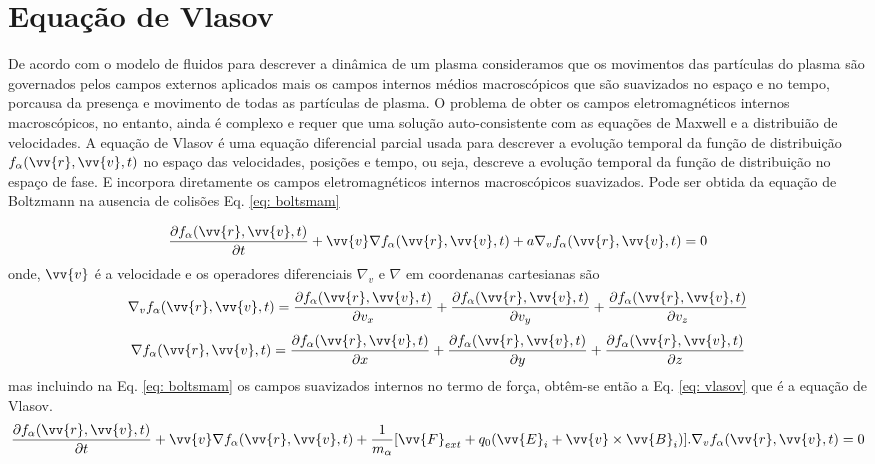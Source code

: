 \documentclass[12pt,oneside,a4paper]{abntex2}
\begin{document}
\section{Equação de Vlasov}
De acordo com o modelo de fluidos para descrever a dinâmica de um plasma consideramos que os movimentos das partículas do plasma são governados pelos campos externos aplicados mais os campos internos médios macroscópicos que são suavizados no espaço e no tempo, porcausa da presença e movimento de todas as partículas de plasma. O problema de obter os campos eletromagnéticos internos macroscópicos, no entanto, ainda é complexo e requer que uma solução auto-consistente com as equações de Maxwell e a distribuião de velocidades.
A equação de Vlasov é uma equação diferencial parcial usada para descrever a evolução temporal da função de distribuição $f_\alpha(\vv{r},\vv{v},t)$ no espaço das velocidades, posições e tempo, ou seja, descreve a evolução temporal da função de distribuição no espaço de fase. E incorpora diretamente os campos eletromagnéticos internos macroscópicos suavizados. Pode ser obtida da equação de Boltzmann na ausencia de colisões Eq. \ref{eq: boltsmam} \cite[p. 193]{bittencourt}

\begin{equation}
\label{eq: boltsmam}
\frac{\partial f_\alpha(\vv{r},\vv{v},t)}{\partial t} +\vv{v} \nabla f_\alpha(\vv{r},\vv{v},t) + a \nabla_v f_\alpha(\vv{r},\vv{v},t) = 0
\end{equation}  
onde, $\vv{v}$ é a velocidade e os operadores diferenciais $\nabla_v$ e $\nabla$ em coordenanas cartesianas são 
$$\nabla_v f_\alpha(\vv{r},\vv{v},t) =  \frac{\partial f_\alpha(\vv{r},\vv{v},t)}{\partial v_x} + \frac{\partial f_\alpha(\vv{r},\vv{v},t)}{\partial v_y} + \frac{\partial f_\alpha(\vv{r},\vv{v},t)}{\partial v_z}$$  
$$\nabla f_\alpha(\vv{r},\vv{v},t) = \frac{\partial f_\alpha(\vv{r},\vv{v},t)}{\partial x} + \frac{\partial f_\alpha(\vv{r},\vv{v},t)}{\partial y} + \frac{\partial f_\alpha(\vv{r},\vv{v},t)}{\partial z}$$
mas incluindo na Eq. \ref{eq: boltsmam} os campos suavizados internos no termo de força, obtêm-se então a Eq. \ref{eq: vlasov} que é a equação de Vlasov.
\begin{equation}
\label{eq: vlasov}
\frac{\partial f_\alpha(\vv{r},\vv{v},t)}{\partial t} +\vv{v} \nabla f_\alpha(\vv{r},\vv{v},t) + \frac{1}{m_\alpha}[\vv{F}_{ext}+q_0(\vv{E}_i+\vv{v} \times \vv{B}_i)] . \nabla_v f_\alpha(\vv{r},\vv{v},t)= 0
\end{equation}
\end{document}

